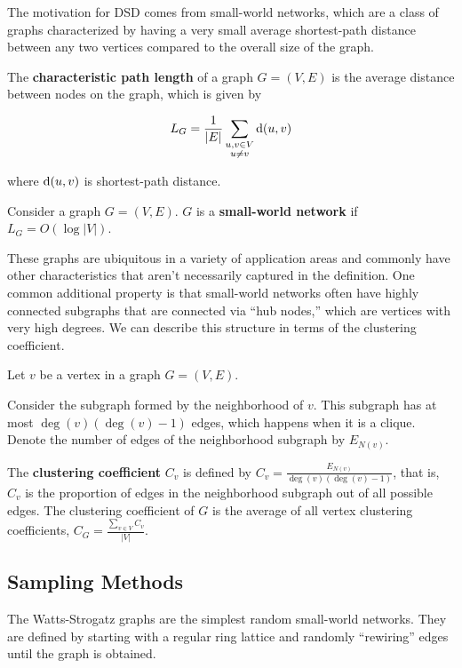 The motivation for DSD comes from small-world networks, which are a class of
graphs characterized by having a very small average shortest-path distance
between any two vertices compared to the overall size of the graph.


\begin{definition}
  The \textbf{characteristic path length} of a graph $G = (V,E)$ is the average distance
  between nodes on the graph, which is given by

  \[ L_G = \frac{1}{|E|} \sum_{\substack{u,v \in V \\ u \neq v}} \mathrm{d}(u,v)\]

  where $\mathrm{d}(u,v)$ is shortest-path distance. 
\end{definition}

\begin{definition}
  Consider a graph $G = (V,E)$. $G$ is a \textbf{small-world network} if
  $L_G = O(\log{|V|})$.
\end{definition}


These graphs are ubiquitous in a variety of application areas and commonly have
other characteristics that aren't necessarily captured in the definition. One
common additional property is that small-world networks often have highly
connected subgraphs that are connected via ``hub nodes,'' which are vertices
with very high degrees. We can describe this structure in terms of the
clustering coefficient.

\begin{definition}
  Let $v$ be a vertex in a graph $G = (V,E)$.

  Consider the subgraph formed by the neighborhood of $v$. This subgraph has at
  most $\deg(v)(\deg(v) - 1)$ edges, which happens when it is a clique. Denote
  the number of edges of the neighborhood subgraph by $E_{N(v)}$.

  The \textbf{clustering coefficient} $C_v$ is defined by
  $C_v = \frac{E_{N(v)}}{\deg(v)(\deg(v) - 1)}$, that is, $C_v$ is the
  proportion of edges in the neighborhood subgraph out of all possible edges.
  The clustering coefficient of $G$ is the average of all vertex clustering
  coefficients, $C_G = \frac{\sum_{v \in V}{C_v}}{|V|}$.
\end{definition}


\subsection{Sampling Methods}

The Watts-Strogatz graphs are the simplest random small-world networks. They are
defined by starting with a regular ring lattice and randomly ``rewiring'' edges
until the graph is obtained.

